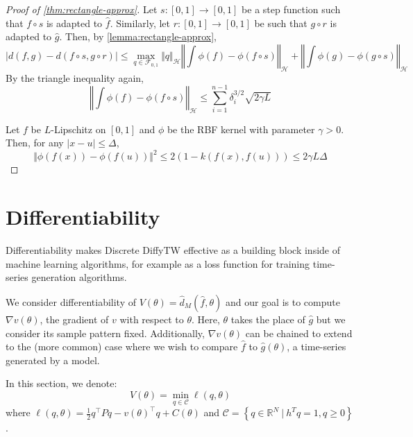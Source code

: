 \begin{proof}[Proof of \cref{thm:rectangle-approx}]
Let $s:[0,1] \to [0,1]$ be a step function such that $f\circ s$ is adapted to $\hat f$. Similarly, let $r:[0,1]\to[0,1]$ be such that $g\circ r$ is adapted to $\hat g$. Then, by \cref{lemma:rectangle-approx},
\begin{equation}
    \vert d(f, g) - d(f \circ s, g\circ r) \vert \leq \max_{q\in\mathcal F_{0,1}}\Vert q \Vert_\mathcal H \left\Vert \int \phi(f) - \phi(f\circ s)\right\Vert_{\mathcal H} + \left\Vert \int \phi(g)- \phi(g\circ s)\right\Vert_\mathcal H
\end{equation}
By the triangle inequality again,
\begin{equation}
\left\Vert \int \phi(f) - \phi(f\circ s)\right\Vert_{\mathcal H} \leq \sum_{i=1}^{n-1} \delta_i^{3/2}\sqrt{2\gamma L}
\end{equation}





Let $f$ be $L$-Lipschitz on $[0,1]$ and $\phi$ be the RBF kernel with parameter $\gamma > 0$.
Then, for any $\vert x - u \vert \leq \Delta$,
\begin{equation}
    \Vert \phi(f(x)) - \phi(f(u)) \Vert^2 \leq 2\left(1 - k(f(x), f(u))\right) \leq 2 \gamma L \Delta
\end{equation}
\end{proof}

\section{Differentiability}
Differentiability makes Discrete DiffyTW effective as a building block inside of machine learning algorithms, for example as a loss function for training time-series generation algorithms.

We consider differentiability of $V(\theta) = \hat d_M(\hat f, \theta)$ and our goal is to compute $\nabla v(\theta)$, the gradient of $v$ with respect to $\theta$. Here, $\theta$ takes the place of $\hat g$ but we consider its sample pattern fixed. Additionally, $\nabla v(\theta)$ can be chained to extend to the (more common) case where we wish to compare $\hat f$ to $\hat g(\theta)$, a time-series generated by a model.

In this section, we denote:
\begin{equation}\label{prob:fullqp}
    V(\theta) = \min_{q\in\mathcal C} \ell(q, \theta)
\end{equation}
where $\ell(q, \theta) = \frac{1}{2} q^\top Pq - v(\theta)^\top q + C(\theta)$ and $\mathcal C = \left\lbrace q\in\mathbb R^N ~\vert~ h^Tq=1, q \geq 0\right\rbrace$.

